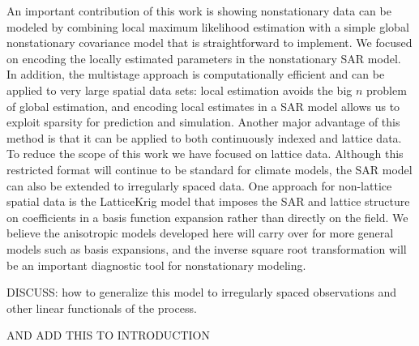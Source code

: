 \documentclass[review]{elsarticle}
\begin{document}
An important contribution of this work is showing nonstationary data can be modeled by combining local maximum likelihood estimation with a simple global nonstationary covariance model that is straightforward to implement. We focused on encoding the locally estimated parameters in the nonstationary SAR model. In addition, the multistage approach is computationally efficient and can be applied to very large spatial data sets: local estimation avoids the big $n$ problem of global estimation, and encoding local estimates in a SAR model allows us to exploit sparsity for prediction and simulation. Another major advantage of this method is that it can be applied to both continuously indexed and lattice data. 
To reduce the scope of this work we have focused on lattice data. Although this restricted format will continue to be standard for climate models, the SAR model can also be extended to irregularly spaced data. One approach for non-lattice spatial data is the LatticeKrig model that imposes the SAR and lattice structure on coefficients in a basis function expansion rather than directly on the field.  We believe the anisotropic models developed here will carry over for more general models such as basis expansions, and the inverse square root transformation will be an important diagnostic tool for nonstationary modeling. 

DISCUSS: how to generalize this model to irregularly spaced observations and other linear functionals of the process. 
 
 AND ADD THIS TO INTRODUCTION
 






\end{document}
